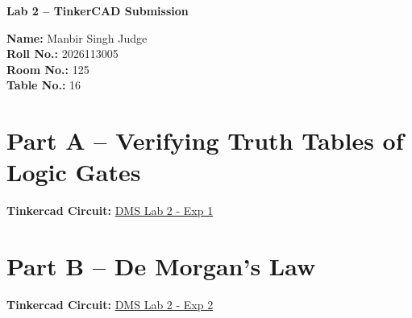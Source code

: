 \documentclass[12pt]{article}
\begin{document}
\begin{center}
    {\Large \textbf{Lab 2 -- TinkerCAD Submission}}
\end{center}

\vspace{1em}

\noindent
\textbf{Name:} Manbir Singh Judge \\[0.5em]
\textbf{Roll No.:} 2026113005 \\[0.5em]
\textbf{Room No.:} 125 \\[0.5em]
\textbf{Table No.:} 16

\vspace{2em}

\section*{Part A -- Verifying Truth Tables of Logic Gates}

\noindent
\textbf{Tinkercad Circuit:}
\href{https://www.tinkercad.com/things/kATGKwCnRwN-dms-lab-2-exp-1?sharecode=7HgT0J6fQ6QNoWgAy2pFz0Ol8pav9oxKmdrKJmCbqXE}{DMS Lab 2 - Exp 1}

\vspace{2em}

\section*{Part B -- De Morgan's Law}

\noindent
\textbf{Tinkercad Circuit:}
\href{https://www.tinkercad.com/things/lKgbpBDrOE0-dms-lab-2-exp-2?sharecode=7S5MEHwnXGBaEBTygyPoW4ldG7CQEkxFdRFCpr8eibA}{DMS Lab 2 - Exp 2}
\end{document}
